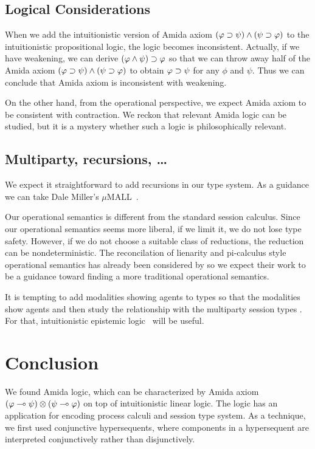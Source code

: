  \subsection{Logical Considerations}

 When we add
 the intuitionistic version of Amida axiom
 $(\varphi\supset\psi)\land(\psi\supset\varphi)$ to the intuitionistic propositional
 logic,
 the logic becomes inconsistent.
 Actually,
 if we have weakening, we can derive $(\varphi\land \psi)\supset \varphi$ so that
 we can throw away half of the Amida axiom
 $(\varphi\supset\psi)\land(\psi\supset\varphi)$ to obtain $\varphi\supset\psi$ for any
 $\phi$ and $\psi$.  Thus we can conclude that Amida axiom is
 inconsistent with weakening.

 On the other hand, from the operational perspective, we expect Amida
 axiom to be consistent with contraction.
 We reckon that relevant Amida logic can be studied, but
 it is a mystery whether such a logic is philosophically relevant.

\subsection{Multiparty, recursions, \ldots}
We expect it straightforward to add recursions in our type system.
As a guidance we can take Dale Miller's $\mu$MALL~.

Our operational semantics is different from the standard session
calculus.  Since our operational semantics seems more liberal,
if we limit it, we do not lose type safety.  However, if we do not
choose a suitable class of reductions, the reduction can be
nondeterministic.
The reconcilation of lienarity and pi-calculus style operational
semantics has already been considered by
\citet{kobayashi-pierce-turner} so we expect their work to be a
guidance toward finding a more traditional operational semantics.

It is tempting to add modalities showing agents to types so that the
modalities show agents and then study the relationship with the
multiparty session types .
For that, intuitionistic epistemic logic~\citet{hirailpar,hiraimaster}
will be useful.

\section{Conclusion}

We found Amida logic, which can be characterized by Amida axiom
$(\varphi\multimap\psi)\otimes(\psi\multimap\varphi)$ on top of intuitionistic
linear logic.
The logic has an application for encoding process calculi and session type
system.
As a technique, we first used conjunctive hypersequents,
where components in a hypersequent are interpreted conjunctively rather
than disjunctively.